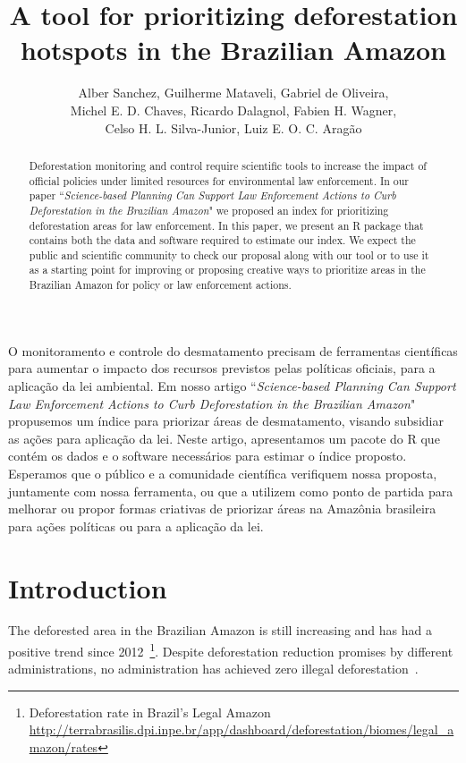 \documentclass[12pt]{article}
\title{A tool for prioritizing deforestation hotspots in the Brazilian Amazon}
\author{
    Alber Sanchez\inst{1},  
    Guilherme Mataveli\inst{1},  
    Gabriel de Oliveira\inst{2},  
    \\
    Michel E. D. Chaves\inst{1,}\inst{5},  
    Ricardo Dalagnol\inst{3},  
    Fabien H. Wagner\inst{3},  
    \\
    Celso H. L. Silva-Junior\inst{4},  
    Luiz E. O. C. Aragão\inst{1}
}
\begin{document}
 

\maketitle

\begin{abstract}
Deforestation monitoring and control require scientific tools to increase the impact of official policies under limited resources for environmental law enforcement.
In our paper ``\textit{Science-based Planning Can Support Law Enforcement Actions to Curb Deforestation in the Brazilian Amazon}" we proposed an index for prioritizing deforestation areas for law enforcement.
In this paper, we present an \textsf{R} package that contains both the data and software required to estimate our index.
We expect the public and scientific community to check our proposal along with our tool or to use it as a starting point for improving or proposing creative ways to prioritize areas in the Brazilian Amazon for policy or law enforcement actions.
\end{abstract}
     
\begin{resumo} 
O monitoramento e controle do desmatamento precisam de ferramentas científicas para  aumentar o impacto dos recursos previstos pelas políticas oficiais, para a aplicação da lei ambiental.
Em nosso artigo ``\textit{Science-based Planning Can Support Law Enforcement Actions to Curb Deforestation in the Brazilian Amazon}" propusemos um índice para priorizar áreas de desmatamento, visando subsidiar as ações para aplicação da lei.
Neste artigo, apresentamos um pacote do \textsf{R} que contém os dados e o software necessários para estimar o índice proposto.
Esperamos que o público e a comunidade científica verifiquem nossa proposta, juntamente com nossa ferramenta, ou que a utilizem como ponto de partida para melhorar ou propor formas criativas de priorizar áreas na Amazônia brasileira para ações políticas ou para a aplicação da lei.
\end{resumo}


\section{Introduction}

The deforested area in the Brazilian Amazon is still increasing and has had a positive trend since 2012~\footnote{Deforestation rate in Brazil's Legal Amazon \url{http://terrabrasilis.dpi.inpe.br/app/dashboard/deforestation/biomes/legal_amazon/rates}}. Despite deforestation reduction promises by different administrations, no administration has achieved zero illegal deforestation~\cite{dearealeaopereira2019}.
\end{document}
